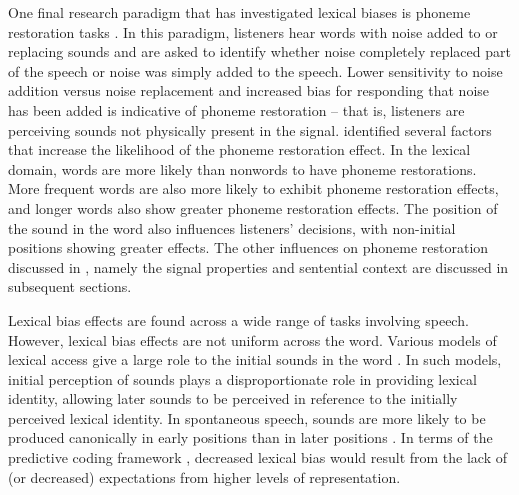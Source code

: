 One final research paradigm that has investigated lexical biases is phoneme restoration tasks \citep{Samuel1981}.  
In this paradigm, listeners hear words with noise added to or replacing sounds and are asked to identify whether noise completely replaced part of the speech or noise was simply added to the speech.  
Lower sensitivity to noise addition versus noise replacement and increased bias for responding that noise has been added is indicative of phoneme restoration -- that is, listeners are perceiving sounds not physically present in the signal.  
\citet{Samuel1981} identified several factors that increase the likelihood of the phoneme restoration effect.
In the lexical domain, words are more likely than nonwords to have phoneme restorations.  
More frequent words are also more likely to exhibit phoneme restoration effects, and longer words also show greater phoneme restoration effects.  
The position of the sound in the word also influences listeners' decisions, with non-initial positions showing greater effects. 
The other influences on phoneme restoration discussed in \citet{Samuel1981}, namely the signal properties and sentential context are discussed in subsequent sections.

Lexical bias effects are found across a wide range of tasks involving speech.
However, lexical bias effects are not uniform across the word.
Various models of lexical access give a large role to the initial sounds in the word \citep{Marslen-Wilson1978, Gow1995}.
In such models, initial perception of sounds plays a disproportionate role in providing lexical identity, allowing later sounds to be perceived in reference to the initially perceived lexical identity.
In spontaneous speech, sounds are more likely to be produced canonically in early positions than in later positions \citep{Pitt2012}.
In terms of the predictive coding framework \citep{Clark2013}, decreased lexical bias would result from the lack of (or decreased) expectations from higher levels of representation.

